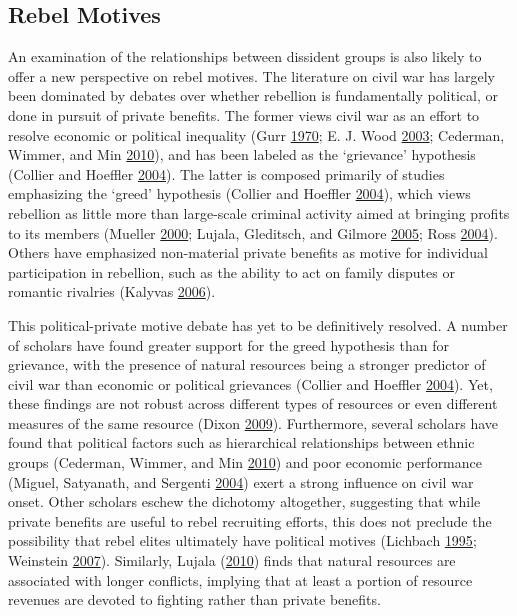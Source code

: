 \documentclass[12pt,]{book}
\theoremstyle{definition}
\theoremstyle{definition}
\theoremstyle{remark}
\begin{document}
\subsection{Rebel Motives}\label{rebel-motives}

An examination of the relationships between dissident groups is also
likely to offer a new perspective on rebel motives. The literature on
civil war has largely been dominated by debates over whether rebellion
is fundamentally political, or done in pursuit of private benefits. The
former views civil war as an effort to resolve economic or political
inequality (Gurr \protect\hyperlink{ref-gurr70}{1970}; E. J. Wood
\protect\hyperlink{ref-Wood2003}{2003}; Cederman, Wimmer, and Min
\protect\hyperlink{ref-Cederman2010}{2010}), and has been labeled as the
`grievance' hypothesis (Collier and Hoeffler
\protect\hyperlink{ref-Collier2004}{2004}). The latter is composed
primarily of studies emphasizing the `greed' hypothesis (Collier and
Hoeffler \protect\hyperlink{ref-Collier2004}{2004}), which views
rebellion as little more than large-scale criminal activity aimed at
bringing profits to its members (Mueller
\protect\hyperlink{ref-mueller00}{2000}; Lujala, Gleditsch, and Gilmore
\protect\hyperlink{ref-Lujala2005}{2005}; Ross
\protect\hyperlink{ref-Ross2004e}{2004}). Others have emphasized
non-material private benefits as motive for individual participation in
rebellion, such as the ability to act on family disputes or romantic
rivalries (Kalyvas \protect\hyperlink{ref-Kalyvas2006}{2006}).

This political-private motive debate has yet to be definitively
resolved. A number of scholars have found greater support for the greed
hypothesis than for grievance, with the presence of natural resources
being a stronger predictor of civil war than economic or political
grievances (Collier and Hoeffler
\protect\hyperlink{ref-Collier2004}{2004}). Yet, these findings are not
robust across different types of resources or even different measures of
the same resource (Dixon \protect\hyperlink{ref-Dixon2009a}{2009}).
Furthermore, several scholars have found that political factors such as
hierarchical relationships between ethnic groups (Cederman, Wimmer, and
Min \protect\hyperlink{ref-Cederman2010}{2010}) and poor economic
performance (Miguel, Satyanath, and Sergenti
\protect\hyperlink{ref-Miguel2004a}{2004}) exert a strong influence on
civil war onset. Other scholars eschew the dichotomy altogether,
suggesting that while private benefits are useful to rebel recruiting
efforts, this does not preclude the possibility that rebel elites
ultimately have political motives (Lichbach
\protect\hyperlink{ref-Lichbach1995}{1995}; Weinstein
\protect\hyperlink{ref-Weinstein2007}{2007}). Similarly, Lujala
(\protect\hyperlink{ref-Lujala2010}{2010}) finds that natural resources
are associated with longer conflicts, implying that at least a portion
of resource revenues are devoted to fighting rather than private
benefits.
\end{document}
